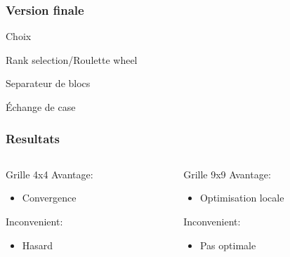 
\begin{frame}
    \frametitle{Version finale}
    \begin{block}{Choix}
        \begin{description}
            \pause
            \item[Selection:] \pause Rank selection/Roulette wheel
            \pause
            \item[Croisement:] \pause Separateur de blocs
            \pause
            \item[Mutation:] \pause Échange de case
        \end{description}
    \end{block}
\end{frame}
\begin{frame}
    \frametitle{Resultats}
    \begin{columns}
        \begin{column}{3cm}
            \begin{block}{Grille 4x4}
                Avantage:
                \begin{itemize}
                    \pause
                    \item Convergence
                \end{itemize}
                Inconvenient:
                \begin{itemize}
                    \pause
                    \item Hasard
                \end{itemize}
            \end{block}
        \end{column}
        \pause
        \begin{column}{3cm}
            \begin{block}{Grille 9x9}
                Avantage:
                \begin{itemize}
                    \pause
                    \item Optimisation locale
                \end{itemize}
                Inconvenient:
                \begin{itemize}
                    \pause
                    \item Pas optimale
                \end{itemize}
            \end{block}
        \end{column}
    \end{columns}
\end{frame}
